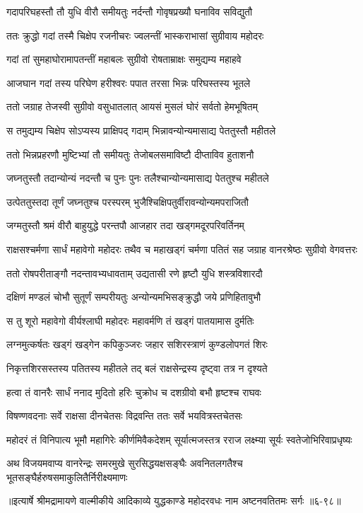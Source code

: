 \twolineshloka
{गदापरिघहस्तौ तौ युधि वीरौ समीयतुः}
{नर्दन्तौ गोवृषप्रख्यौ घनाविव सविद्युतौ} %

\twolineshloka
{ततः क्रुद्धो गदां तस्मै चिक्षेप रजनीचरः}
{ज्वलन्तीं भास्कराभासां सुग्रीवाय महोदरः} %

\twolineshloka
{गदां तां सुमहाघोरामापतन्तीं महाबलः}
{सुग्रीवो रोषताम्राक्षः समुद्यम्य महाहवे} %

\twolineshloka
{आजघान गदां तस्य परिघेण हरीश्वरः}
{पपात तरसा भिन्नः परिघस्तस्य भूतले} %

\twolineshloka
{ततो जग्राह तेजस्वी सुग्रीवो वसुधातलात्}
{आयसं मुसलं घोरं सर्वतो हेमभूषितम्} %

\twolineshloka
{स तमुद्यम्य चिक्षेप सोऽप्यस्य प्राक्षिपद् गदाम्}
{भिन्नावन्योन्यमासाद्य पेततुस्तौ महीतले} %

\twolineshloka
{ततो भिन्नप्रहरणौ मुष्टिभ्यां तौ समीयतुः}
{तेजोबलसमाविष्टौ दीप्ताविव हुताशनौ} %

\twolineshloka
{जघ्नतुस्तौ तदान्योन्यं नदन्तौ च पुनः पुनः}
{तलैश्चान्योन्यमासाद्य पेततुश्च महीतले} %

\twolineshloka
{उत्पेततुस्तदा तूर्णं जघ्नतुश्च परस्परम्}
{भुजैश्चिक्षिपतुर्वीरावन्योन्यमपराजितौ} %

\twolineshloka
{जग्मतुस्तौ श्रमं वीरौ बाहुयुद्धे परन्तपौ}
{आजहार तदा खड्गमदूरपरिवर्तिनम्} %

\threelineshloka
{राक्षसश्चर्मणा सार्धं महावेगो महोदरः}
{तथैव च महाखड्गं चर्मणा पतितं सह}
{जग्राह वानरश्रेष्ठः सुग्रीवो वेगवत्तरः} %

\twolineshloka
{ततो रोषपरीताङ्गौ नदन्तावभ्यधावताम्}
{उद्यतासी रणे हृष्टौ युधि शस्त्रविशारदौ} %

\twolineshloka
{दक्षिणं मण्डलं चोभौ सुतूर्णं सम्परीयतुः}
{अन्योन्यमभिसङ्क्रुद्धौ जये प्रणिहितावुभौ} %

\twolineshloka
{स तु शूरो महावेगो वीर्यश्लाघी महोदरः}
{महावर्मणि तं खड्गं पातयामास दुर्मतिः} %

\twolineshloka
{लग्नमुत्कर्षतः खड्गं खड्गेन कपिकुञ्जरः}
{जहार सशिरस्त्राणं कुण्डलोपगतं शिरः} %

\twolineshloka
{निकृत्तशिरसस्तस्य पतितस्य महीतले}
{तद् बलं राक्षसेन्द्रस्य दृष्ट्वा तत्र न दृश्यते} %

\twolineshloka
{हत्वा तं वानरैः सार्धं ननाद मुदितो हरिः}
{चुक्रोध च दशग्रीवो बभौ हृष्टश्च राघवः} %

\twolineshloka
{विषण्णवदनाः सर्वे राक्षसा दीनचेतसः}
{विद्रवन्ति ततः सर्वे भयवित्रस्तचेतसः} %

\twolineshloka
{महोदरं तं विनिपात्य भूमौ महागिरेः कीर्णमिवैकदेशम्}
{सूर्यात्मजस्तत्र रराज लक्ष्म्या सूर्यः स्वतेजोभिरिवाप्रधृष्यः} %

\twolineshloka
{अथ विजयमवाप्य वानरेन्द्रः समरमुखे सुरसिद्धयक्षसङ्घैः}
{अवनितलगतैश्च भूतसङ्घैर्हरुषसमाकुलितैर्निरीक्ष्यमाणः} %


॥इत्यार्षे श्रीमद्रामायणे वाल्मीकीये आदिकाव्ये युद्धकाण्डे महोदरवधः नाम अष्टनवतितमः सर्गः ॥६-९८॥
